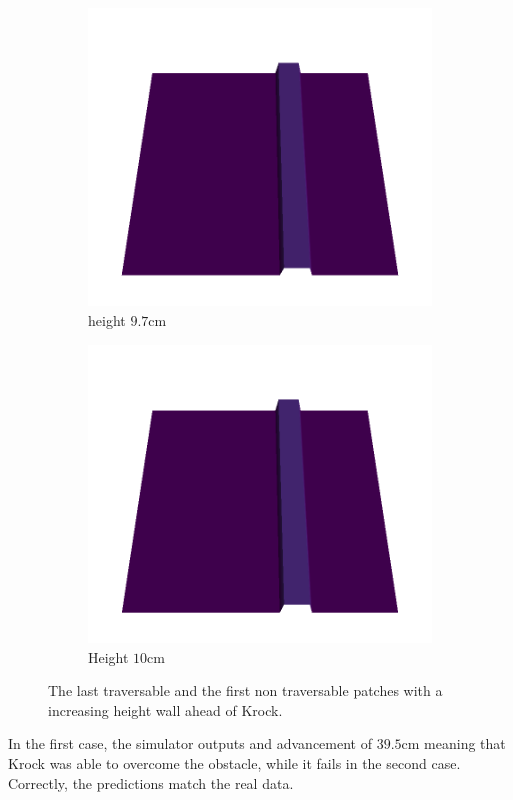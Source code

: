 \begin{figure}[H]
\begin{subfigure}[b]{0.33\textwidth}
    \end{subfigure}   
    \begin{subfigure}[b]{0.33\textwidth}
        \includegraphics[width=\linewidth]{../img/5/custom_patches/walls_increasing/1-3d.png}
    \caption{height $9.7$cm}
    \end{subfigure}   
    \begin{subfigure}[b]{0.33\textwidth}
        \includegraphics[width=\linewidth]{../img/5/custom_patches/walls_increasing/2-3d}
        \caption{Height $10$cm}
    \end{subfigure}   
\caption{The last traversable and the first non traversable patches   with a increasing height wall ahead of Krock.}    
\end{figure}
In the first case, the simulator outputs and advancement of $39.5$cm meaning that Krock was able to overcome the obstacle, while it fails in the second case. Correctly, the predictions match the real data.

